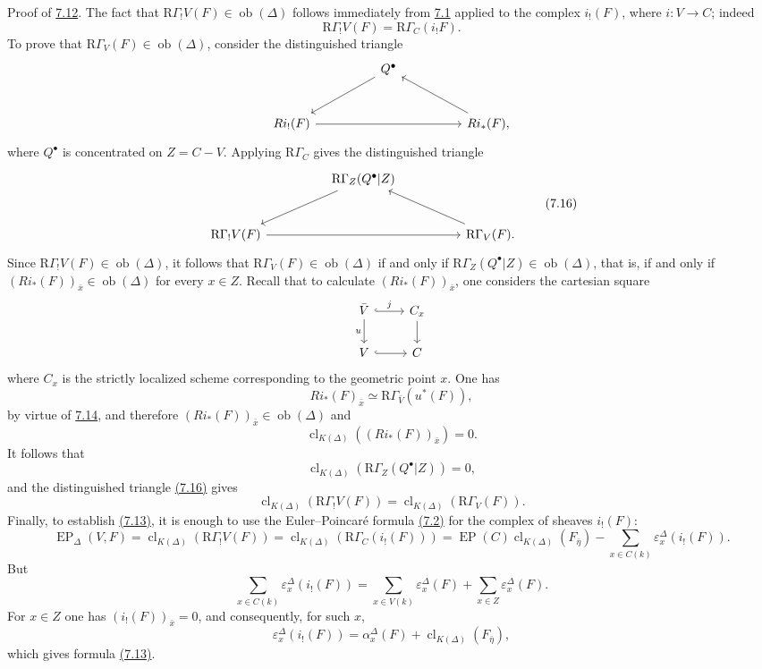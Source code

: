 \documentclass[11pt]{article}
\providecommand{\EP}{\operatorname{EP}}
\providecommand{\Ob}{\operatorname{ob}}
\providecommand{\Ob}{\operatorname{ob}}
\providecommand{\EP}{\operatorname{EP}}
\providecommand{\Ob}{\operatorname{Ob}}
\providecommand{\clK}[1]{\operatorname{cl}_{K(#1)}}
\providecommand{\RG}{\mathrm R\Gamma}
\providecommand{\Ob}{\operatorname{ob}}
\providecommand{\Ob}{\operatorname{Ob}}
\begin{document}
Proof of \hyperref[sga5:X:corollary:7.12]{7.12}. The fact that $\RG_!V(F)\in\Ob(\Delta)$ follows immediately from \hyperref[sga5:X:theorem:7.1]{7.1} applied to the complex $i_!(F)$, where $i:V\to C$; indeed
\[
\RG_!V(F)=\RG_C(i_!F).
\]
To prove that $\RG_V(F)\in\Ob(\Delta)$, consider the distinguished triangle
\[
\begin{tikzcd}[column sep=huge,row sep=large]
& Q^\bullet \arrow[dl] &\\
Ri_!(F) \arrow[rr] && Ri_*(F) \arrow[ul],
\end{tikzcd}
\]
where $Q^\bullet$ is concentrated on $Z=C-V$. Applying $\RG_C$ gives the distinguished triangle
\[
\begin{tikzcd}[column sep=huge,row sep=large]
& \RG_Z(Q^\bullet|Z) \arrow[dl] &\\
\RG_!V(F) \arrow[rr] && \RG_V(F) \arrow[ul].
\end{tikzcd}
\tag{7.16}\label{sga5:X:equation:7.16}
\]
Since $\RG_!V(F)\in\Ob(\Delta)$, it follows that $\RG_V(F)\in\Ob(\Delta)$ if and only if $\RG_Z(Q^\bullet|Z)\in\Ob(\Delta)$, that is, if and only if $(Ri_*(F))_{\bar x}\in\Ob(\Delta)$ for every $x\in Z$. Recall that to calculate $(Ri_*(F))_{\bar x}$, one considers the cartesian square
\[
\begin{tikzcd}
\bar V \arrow[r,hook,"j"] \arrow[d,"u"'] & C_x \arrow[d]\\
V \arrow[r,hook] & C
\end{tikzcd}
\]
where $C_x$ is the strictly localized scheme corresponding to the geometric point $x$. One has
\[
Ri_*(F)_{\bar x}\simeq \RG_{\bar V}(u^*(F)),
\]
by virtue of \hyperref[sga5:X:lemma:7.14]{7.14}, and therefore $(Ri_*(F))_{\bar x}\in\Ob(\Delta)$ and
\[
\clK{\Delta}((Ri_*(F))_{\bar x})=0.
\]
It follows that
\[
\clK{\Delta}(\RG_Z(Q^\bullet|Z))=0,
\]
and the distinguished triangle \hyperref[sga5:X:equation:7.16]{(7.16)} gives
\[
\clK{\Delta}(\RG_!V(F))=\clK{\Delta}(\RG_V(F)).
\]
Finally, to establish \hyperref[sga5:X:equation:7.13]{(7.13)}, it is enough to use the Euler--Poincaré formula \hyperref[sga5:X:equation:7.2]{(7.2)} for the complex of sheaves $i_!(F)$:
\[
\EP_\Delta(V,F)
=
\clK{\Delta}(\RG_!V(F))
=
\clK{\Delta}(\RG_C(i_!(F)))
=
\EP(C)\clK{\Delta}(F_{\bar\eta})
-\sum_{x\in C(k)}\varepsilon_x^\Delta(i_!(F)).
\]
But
\[
\sum_{x\in C(k)}\varepsilon_x^\Delta(i_!(F))
=
\sum_{x\in V(k)}\varepsilon_x^\Delta(F)
+\sum_{x\in Z}\varepsilon_x^\Delta(F).
\]
For $x\in Z$ one has $(i_!(F))_{\bar x}=0$, and consequently, for such $x$,
\[
\varepsilon_x^\Delta(i_!(F))
=
\alpha_x^\Delta(F)+\clK{\Delta}(F_{\bar\eta}),
\]
which gives formula \hyperref[sga5:X:equation:7.13]{(7.13)}.
\end{document}
